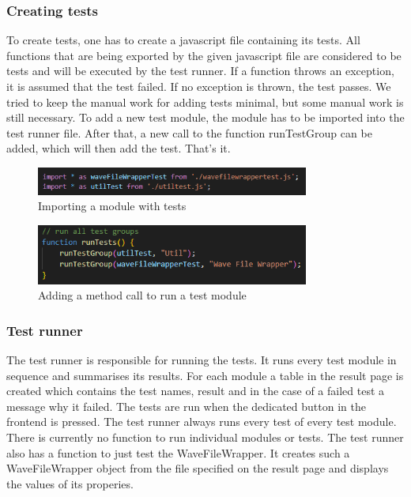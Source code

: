 \subsubsection{Creating tests}
To create tests, one has to create a javascript file containing its tests.
All functions that are being exported by the given javascript file are considered to be tests and will be executed by the test runner.
If a function throws an exception, it is assumed that the test failed.
If no exception is thrown, the test passes.
We tried to keep the manual work for adding tests minimal, but some manual work is still necessary.
To add a new test module, the module has to be imported into the test runner file.
After that, a new call to the function runTestGroup can be added, which will then add the test.
That's it.

\begin{figure}[H]
    \centering
    \includegraphics[width=0.8\textwidth]{../assets/import_test_module.png}
    \caption{Importing a module with tests}\label{fig:importing-module-with-tests}
\end{figure}

\begin{figure}[H]
    \centering
    \includegraphics[width=0.8\textwidth]{../assets/add_call_to_runTestGroup.png}
    \caption{Adding a method call to run a test module}\label{fig:adding-a-method-call-to-run-a-test-module}
\end{figure}

\subsubsection{Test runner}
The test runner is responsible for running the tests.
It runs every test module in sequence and summarises its results.
For each module a table in the result page is created which contains the test names, result and in the case of a failed test a message why it failed.
The tests are run when the dedicated button in the frontend is pressed.
The test runner always runs every test of every test module.
There is currently no function to run individual modules or tests.
The test runner also has a function to just test the WaveFileWrapper.
It creates such a WaveFileWrapper object from the file specified on the result page and displays the values of its properies.


